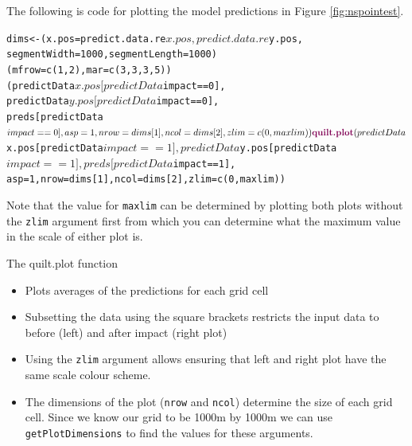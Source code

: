 \noindent The following is code for plotting the model predictions in Figure \ref{fig:nspointest}.
\begin{knitrout}\footnotesize
{}\color{fgcolor}\begin{kframe}
\begin{alltt}
dims<-(x.pos=predict.data.re$x.pos, predict.data.re$y.pos, 
   segmentWidth=1000, segmentLength=1000)
(mfrow=c(1,2), mar=c(3,3,3,5))
(predictData$x.pos[predictData$impact==0], 
    predictData$y.pos[predictData$impact==0], 
    preds[predictData$impact==0], asp=1, nrow=dims[1], ncol=dims[2], 
    zlim=c(0, maxlim))
\hlfunctioncall{quilt.plot}(predictData$x.pos[predictData$impact==1], 
    predictData$y.pos[predictData$impact==1], preds[predictData$impact==1], 
    asp=1,nrow=dims[1], ncol=dims[2], zlim=c(0, maxlim))
\end{alltt}
\end{kframe}
\end{knitrout}
\noindent Note that the value for {\tt maxlim} can be determined by plotting both plots without the {\tt zlim} argument first from which you can determine what the maximum value in the scale of either plot is. 
\begin{block}{The quilt.plot function}
\begin{itemize}
\item{Plots averages of the predictions for each grid cell}
\item{Subsetting the data using the square brackets restricts the input data to before (left) and after impact (right plot)}
\item{Using the {\tt zlim} argument allows ensuring that left and right plot have the same scale colour scheme. }
\item{The dimensions of the plot ({\tt nrow} and {\tt ncol}) determine the size of each grid cell.  Since we know our grid to be 1000m by 1000m we can use {\tt getPlotDimensions} to find the values for these arguments.}
\end{itemize}
\end{block}

